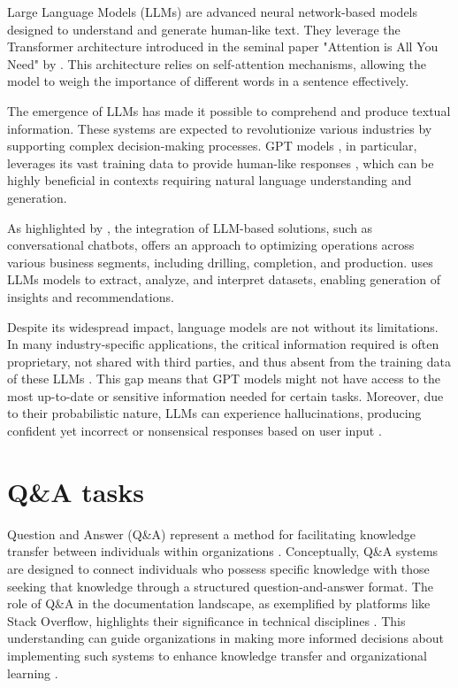         Large Language Models (LLMs) are advanced neural network-based models designed to understand and generate human-like text. They leverage the Transformer architecture introduced in the seminal paper "Attention is All You Need" by \cite{Vaswani2017}. This architecture relies on self-attention mechanisms, allowing the model to weigh the importance of different words in a sentence effectively. 

        The emergence of LLMs has made it possible to comprehend and produce textual information. These systems are expected to revolutionize various industries by supporting complex decision-making processes. GPT models \cite{OpenAI2023}, in particular, leverages its vast training data to provide human-like responses \cite{Mosser2024}, which can be highly beneficial in contexts requiring natural language understanding and generation. 
        
        As highlighted by \cite{Singh2023}, the integration of LLM-based solutions, such as conversational chatbots, offers an approach to optimizing operations across various business segments, including drilling, completion, and production. \cite{Singh2023} uses LLMs models to extract, analyze, and interpret datasets, enabling generation of insights and recommendations. 

        Despite its widespread impact, language models are not without its limitations. In many industry-specific applications, the critical information required is often proprietary, not shared with third parties, and thus absent from the training data of these LLMs \cite{Mosser2024}. This gap means that GPT models might not have access to the most up-to-date or sensitive information needed for certain tasks. Moreover, due to their probabilistic nature, LLMs can experience hallucinations, producing confident yet incorrect or nonsensical responses based on user input \cite{OpenAI2023}. 

    \section{Q\&A tasks}     

        Question and Answer (Q\&A) represent a method for facilitating knowledge transfer between individuals within organizations \citep{Iske2005}. Conceptually, Q\&A systems are designed to connect individuals who possess specific knowledge with those seeking that knowledge through a structured question-and-answer format. 
        The role of Q\&A in the documentation landscape, as exemplified by platforms like Stack Overflow, highlights their significance in technical disciplines \citep{Treude2011}. This understanding can guide organizations in making more informed decisions about implementing such systems to enhance knowledge transfer and organizational learning \citep{Iske2005}.

